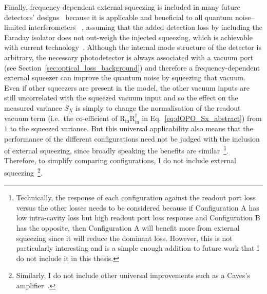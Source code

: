 Finally, frequency-dependent external squeezing is included in many future detectors' designs~\cite{} because it is applicable and beneficial to all quantum noise--limited interferometers~\cite{} , assuming that the added detection loss by including the Faraday isolator does not out-weigh the injected squeezing, which is achievable with current technology~\cite{}. Although the internal mode structure of the detector is arbitrary, the necessary photodetector is always associated with a vacuum port (see Section~\ref{sec:optical_loss_background}) and therefore a frequency-dependent external squeezer can improve the quantum noise by squeezing that vacuum. Even if other squeezers are present in the model, the other vacuum inputs are still uncorrelated with the squeezed vacuum input and so the effect on the measured variance $S_X$ is simply to change the normalisation of the readout vacuum term (i.e.\ the co-efficient of $\text{R}_\text{in} \text{R}_\text{in}^\dag$ in Eq.~\ref{eq:dOPO_Sx_abstract}) from $1$ to the squeezed variance. But this universal applicability also means that the performance of the different configurations need not be judged with the inclusion of external squeezing, since broadly speaking the benefits are similar~\footnote{Technically, the response of each configuration against the readout port loss versus the other losses needs to be considered because if Configuration A has low intra-cavity loss but high readout port loss response and Configuration B has the opposite, then Configuration A will benefit more from external squeezing since it will reduce the dominant loss. However, this is not particularly interesting and is a simple enough addition to future work that I do not include it in this thesis.}. Therefore, to simplify comparing configurations, I do not include external squeezing~\footnote{Similarly, I do not include other universal improvements such as a Caves's amplifier~\cite{}.}. %





